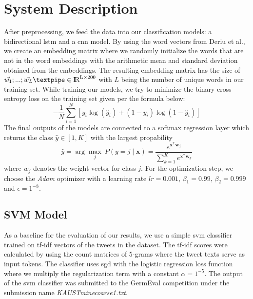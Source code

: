 \documentclass[11pt]{article}
\begin{document}
\section{System Description}
After preprocessing, we feed the data into our classification models: a bidirectional \ac{lstm} and a \ac{cnn} model. By using the word vectors from Deriu et al., we create an embedding matrix where we randomly initialize the words that are not in the word embeddings with the arithmetic mean and standard deviation obtained from the embeddings. The resulting embedding matrix has the size of \textpipe $\vec{w_1}; ... ;\vec{w_L} \textpipe \in \rm{I\!R}^{L\times200}$ with $L$ being the number of unique words in our training set.
\newline
While training our models, we try to minimize the binary cross entropy loss on the training set given per the formula below:
\begin{equation}
-\frac{1}{N}\sum_{i=1}^N [y_i \log(\hat{y}_i)+(1-y_i) \log(1-\hat{y}_i)]
\end{equation}
The final outputs of the models are connected to a softmax regression layer which returns the class $\hat{y}\in[1,K]$ with the largest propability
\begin{equation}
{\displaystyle \hat{y}=\arg\max_{j} \ P(y=j\mid \mathbf {x} )={\frac {e^{\mathbf {x} ^{\mathsf {T}}\mathbf {w} _{j}}}{\sum _{k=1}^{K}e^{\mathbf {x} ^{\mathsf {T}}\mathbf {w} _{k}}}}}
\end{equation}
where $w_j$ denotes the weight vector for class $j$. For the optimization step, we choose the \textit{Adam} optimizer \cite{RN67} with a learning rate $lr=0.001$, $\beta_1=0.99$, $\beta_2=0.999$ and $\epsilon=1^{-8}$.
\subsection{SVM Model}
As a baseline for the evaluation of our results, we use a simple \ac{svm} classifier trained on \ac{tf-idf} vectors \cite{RN75} of the tweets in the dataset. The \ac{tf-idf} scores were calculated by using the count matrices of 5-grams where the tweet texts serve as input tokens. The classifier uses \ac{sgd} with the logistic regression loss function where we multiply the regularization term with a constant $\alpha=1^{-5}$. 
\newline
The output of the \ac{svm} classifier was submitted to the GermEval competition under the submission name \textit{KAUSTmine\textunderscore coarse\textunderscore 1.txt}.
\end{document}
